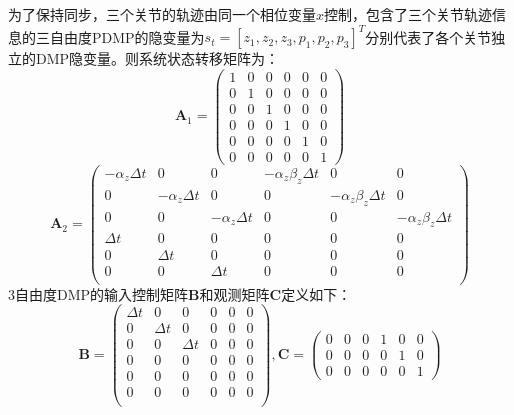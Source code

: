 为了保持同步，三个关节的轨迹由同一个相位变量$x$控制，包含了三个关节轨迹信息的三自由度PDMP的隐变量为$s_t=[z_1,z_2,z_3,p_1,p_2,p_3]^T$分别代表了各个关节独立的DMP隐变量。则系统状态转移矩阵为：
\begin{equation}
    \mathbf{A}_1=\left(\begin{array}{llllll}
    1 & 0 & 0 & 0 & 0 & 0\\
    0 & 1 & 0 & 0 & 0 & 0\\
    0 & 0 & 1 & 0 & 0 & 0\\
    0 & 0 & 0 & 1 & 0 & 0\\
    0 & 0 & 0 & 0 & 1 & 0\\
    0 & 0 & 0 & 0 & 0 & 1
    \end{array}\right)
    \label{eq:4-40}
\end{equation}
\begin{equation}
    \mathbf{A}_2=\left(\begin{array}{cccccc}
    -\alpha_z \Delta t & 0 & 0 & -\alpha_z \beta_z \Delta t & 0 & 0 \\
    0 &-\alpha_z \Delta t & 0 & 0 &-\alpha_z \beta_z \Delta t & 0 \\
    0 & 0 & -\alpha_z \Delta t & 0 & 0 &  -\alpha_z \beta_z \Delta t \\
    \Delta t & 0 & 0 & 0 & 0 & 0 \\
    0 & \Delta t & 0 & 0 & 0 & 0 \\
    0 & 0 & \Delta t &  0 & 0 & 0 \\
    \end{array}\right)
    \label{eq:4-41}
\end{equation}
3自由度DMP的输入控制矩阵$\mathbf{B}$和观测矩阵$\mathbf{C}$定义如下：
\begin{equation}
    \mathbf{B}=\left(\begin{array}{cccccc}
    \Delta t & 0 & 0 & 0& 0& 0\\
    0 & \Delta t & 0 & 0& 0& 0\\
    0 & 0 & \Delta t & 0& 0& 0\\
    0 & 0 & 0 & 0& 0& 0\\
    0 & 0 & 0 & 0& 0& 0\\
    0 & 0 & 0 & 0& 0& 0\\
    \end{array}\right), \mathbf{C}=\left(\begin{array}{llllll}
    0 & 0 & 0 & 1 & 0 &0\\
    0 & 0 & 0 & 0 & 1 &0\\
    0 & 0 & 0 & 0 & 0 &1
    \end{array}\right)
    \label{eq:4-42}
\end{equation}
